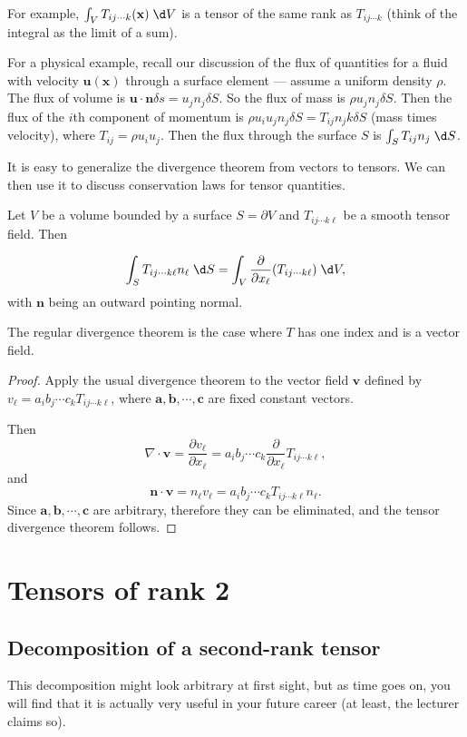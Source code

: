 \documentclass[a4paper]{article}
\begin{document}
For example, $\int_V T_{ij\cdots k}(\mathbf{x})\;\d V$ is a tensor of the same rank as $T_{ij\cdots k}$ (think of the integral as the limit of a sum).

For a physical example, recall our discussion of the flux of quantities for a fluid with velocity $\mathbf{u}(\mathbf{x})$ through a surface element --- assume a uniform density $\rho$. The flux of volume is $\mathbf{u}\cdot \mathbf{n}\delta s = u_j n_j \delta S$. So the flux of mass is $\rho u_j n_j \delta S$. Then the flux of the $i$th component of momentum is $\rho u_i u_j n_j \delta S = T_{ij}n_jk \delta S$ (mass times velocity), where $T_{ij} = \rho u_iu_j$. Then the flux through the surface $S$ is $\int_S T_{ij}n_j \;\d S$.

It is easy to generalize the divergence theorem from vectors to tensors. We can then use it to discuss conservation laws for tensor quantities.

Let $V$ be a volume bounded by a surface $S=\partial V$ and $T_{ij\cdots k\ell}$ be a smooth tensor field. Then

\begin{thm}
  \[
    \int_S T_{ij\cdots k\ell}n_\ell\;\d S = \int_V \frac{\partial}{\partial x_\ell}(T_{ij\cdots k\ell})\;\d V,
  \]
  with $\mathbf{n}$ being an outward pointing normal.
\end{thm}
The regular divergence theorem is the case where $T$ has one index and is a vector field.

\begin{proof}
  Apply the usual divergence theorem to the vector field $\mathbf{v}$ defined by $v_\ell = a_i b_j \cdots c_k T_{ij\cdots k\ell}$, where $\mathbf{a}, \mathbf{b}, \cdots, \mathbf{c}$ are fixed constant vectors.

  Then
  \[
    \nabla\cdot \mathbf{v} = \frac{\partial v_\ell}{\partial x_\ell} = a_i b_j \cdots c_k \frac{\partial}{\partial x_\ell}T_{ij\cdots k\ell},
  \]
  and
  \[
    \mathbf{n}\cdot \mathbf{v} = n_\ell v_\ell = a_i b_j \cdots c_k T_{ij\cdots k\ell }n_\ell.
  \]
  Since $\mathbf{a}, \mathbf{b}, \cdots, \mathbf{c}$ are arbitrary, therefore they can be eliminated, and the tensor divergence theorem follows.
\end{proof}
\section{Tensors of rank 2}
\subsection{Decomposition of a second-rank tensor}
This decomposition might look arbitrary at first sight, but as time goes on, you will find that it is actually very useful in your future career (at least, the lecturer claims so).
\end{document}
